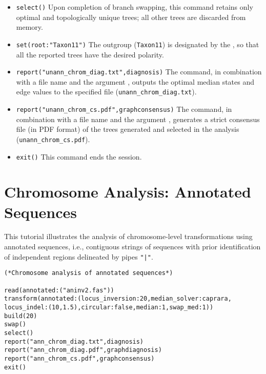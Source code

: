 \begin{itemize}
\item \texttt{select()} Upon completion of branch swapping, this 
command retains only optimal and topologically unique trees; all 
other trees are discarded from memory.  
\item \texttt{set(root:"Taxon11")} The outgroup (\texttt{Taxon11}) 
is designated by the , so that all the reported 
trees have the desired polarity.  
\item \texttt{report("unann\_chrom\_diag.txt",diagnosis)}  The
 command, in combination with a file name and
the argument , outputs the optimal median
states and edge values to the specified file
(\texttt{unann\_chrom\_diag.txt}).  
\item \texttt{report("unann\_chrom\_cs.pdf",graphconsensus)}  The
 command, in combination with a file name and
the argument , generates a strict
consensus file (in PDF format) of the trees generated and selected
in the analysis (\texttt{unann\_chrom\_cs.pdf}).  
\item \texttt{exit()}
This command ends the \poy session.  
\end{itemize}



\section{Chromosome Analysis: Annotated Sequences}{\label{tutorial9}}

This tutorial illustrates the analysis of chromosome-level transformations using 
annotated sequences, i.e., contiguous strings of sequences with prior 
identification of independent regions delineated by pipes \texttt{"|"}. 

\begin{verbatim}
(*Chromosome analysis of annotated sequences*)

read(annotated:("aninv2.fas"))
transform(annotated:(locus_inversion:20,median_solver:caprara,
locus_indel:(10,1.5),circular:false,median:1,swap_med:1))
build(20)
swap()
select()
report("ann_chrom_diag.txt",diagnosis)
report("ann_chrom_diag.pdf",graphdiagnosis)
report("ann_chrom_cs.pdf",graphconsensus)
exit()
\end{verbatim}

